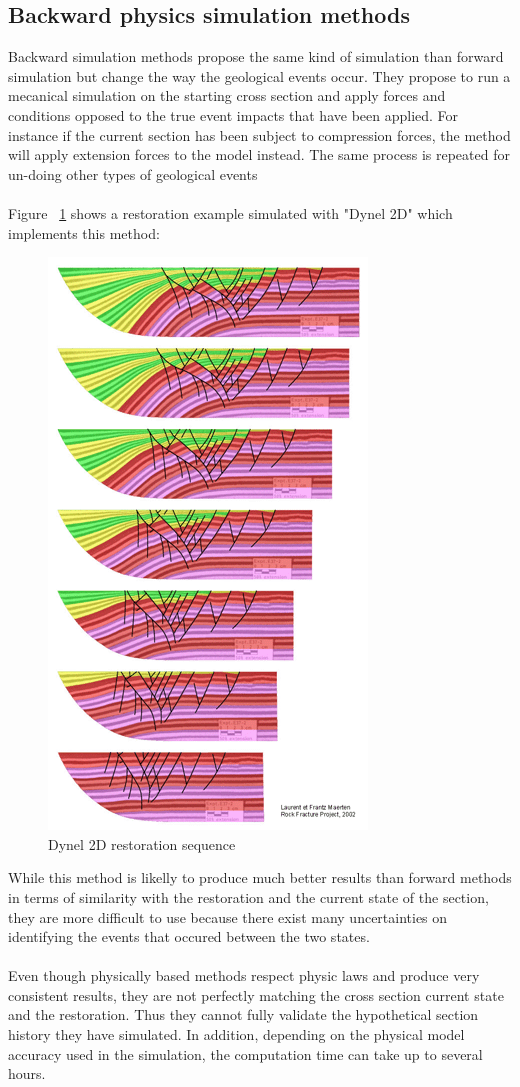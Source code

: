 \documentclass[12pt, a4paper]{report} %
\begin{document}
\subsection{Backward physics simulation methods}
Backward simulation methods propose the same kind of simulation than forward simulation but change the way the geological events occur. They propose to run a mecanical simulation on the starting cross section and apply forces and conditions opposed to the true event impacts that have been applied. For instance if the current section has been subject to compression forces, the method will apply extension forces to the model instead. The same process is repeated for un-doing other types of geological events\\\\
 Figure ~\ref{dyn2} shows a restoration example simulated with "Dynel 2D" \cite{Dynel} which implements this method:
 \begin{figure}[H]
	\centering
	\includegraphics[scale=0.6]{dynel2D.png}
	\caption{Dynel 2D restoration sequence}
	\label{dyn2}
\end{figure}

 While this method is likelly to produce much better results than forward methods in terms of similarity with the restoration and the current state of the section, they are more difficult to use because there exist many uncertainties on identifying the events that occured between the two states.\\\\
Even though physically based methods respect physic laws and produce very consistent results, they are not perfectly matching the cross section current state and the restoration. Thus they cannot fully validate the hypothetical section history they have simulated. In addition, depending on the physical model accuracy used in the simulation, the computation time can take up to several hours.
\end{document}
